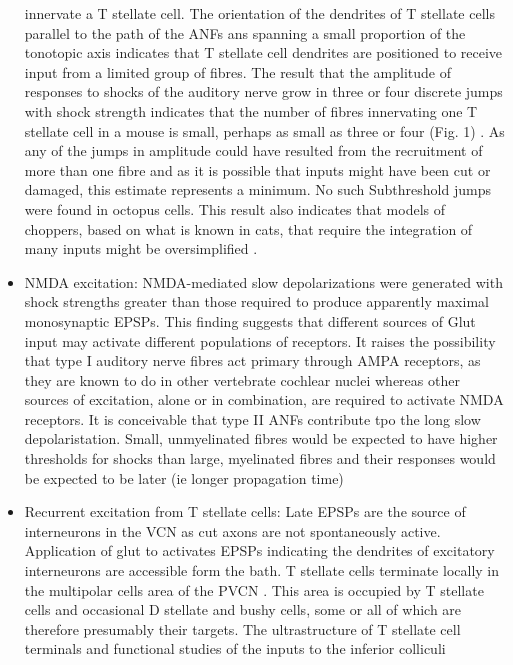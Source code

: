 \documentclass[10pt,a4paper]{article}
\begin{document}
\begin{itemize}
  innervate a T stellate cell.  The orientation of the dendrites of T stellate
  cells parallel to the path of the ANFs ans spanning a small proportion of the
  tonotopic axis indicates that T stellate cell dendrites are positioned to
  receive input from a limited group of fibres. The result that the amplitude of
  responses to shocks of the auditory nerve grow in three or four discrete jumps
  with shock strength indicates that the number of fibres innervating one T
  stellate cell in a mouse is small, perhaps as small as three or four (Fig. 1)
  . As any of the jumps in amplitude could have resulted from the recruitment of
  more than one fibre and as it is possible that inputs might have been cut or
  damaged, this estimate represents a minimum. No such Subthreshold jumps were
  found in octopus cells. This result also indicates that models of choppers,
  based on what is known in cats, that require the integration of many inputs
  might be oversimplified
  \citep{BanksSachs:1991,MolnarPfeiffer:1968,WangSachs:1995}.
\item NMDA excitation: NMDA-mediated slow depolarizations were generated with
  shock strengths greater than those required to produce apparently maximal
  monosynaptic EPSPs.  This finding suggests that different sources of Glut
  input may activate different populations of receptors.  It raises the
  possibility that type I auditory nerve fibres act primary through AMPA
  receptors, as they are known to do in other vertebrate cochlear nuclei
  \citep{RamanZhangEtAl:1994,ZhangTrussell:1994} whereas other sources of
  excitation, alone or in combination, are required to activate NMDA receptors.
  It is conceivable that type II ANFs contribute tpo the long slow
  depolaristation.  Small, unmyelinated fibres would be expected to have higher
  thresholds for shocks than large, myelinated fibres and their responses would
  be expected to be later (ie longer propagation time)
\item Recurrent excitation from T stellate cells: Late EPSPs are the source of
  interneurons in the VCN as cut axons are not spontaneously active.
  Application of glut to activates EPSPs indicating the dendrites of excitatory
  interneurons are accessible form the bath. T stellate cells terminate locally
  in the multipolar cells area of the PVCN
  \citep{FerragamoGoldingEtAl:1998a,OertelWuEtAl:1990}. This area is occupied by
  T stellate cells and occasional D stellate and bushy cells, some or all of
  which are therefore presumably their targets. The ultrastructure of T stellate
  cell terminals and functional studies of the inputs to the inferior colliculi

\end{itemize}
\end{document}
